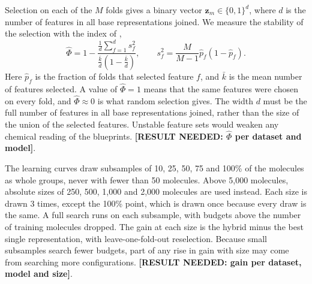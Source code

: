 Selection on each of the $M$ folds gives a binary vector $\mathbf{z}_m \in \{0,1\}^d$, where $d$ is the number of features in all base representations joined. We measure the stability of the selection with the index of \citet{Nogueira2018},
\[
\hat\Phi = 1 - \frac{\frac1d\sum_{f=1}^d s_f^2}{\frac{\bar k}{d}\left(1-\frac{\bar k}{d}\right)}, \qquad s_f^2 = \frac{M}{M-1}\hat p_f(1-\hat p_f).
\]
Here $\hat p_f$ is the fraction of folds that selected feature $f$, and $\bar k$ is the mean number of features selected. A value of $\hat\Phi=1$ means that the same features were chosen on every fold, and $\hat\Phi \approx 0$ is what random selection gives. The width $d$ must be the full number of features in all base representations joined, rather than the size of the union of the selected features. Unstable feature sets would weaken any chemical reading of the blueprints. \textbf{[RESULT NEEDED: $\hat\Phi$ per dataset and model]}.

The learning curves draw subsamples of 10, 25, 50, 75 and 100\% of the molecules as whole groups, never with fewer than 50 molecules. Above 5,000 molecules, absolute sizes of 250, 500, 1,000 and 2,000 molecules are used instead. Each size is drawn 3 times, except the 100\% point, which is drawn once because every draw is the same. A full search runs on each subsample, with budgets above the number of training molecules dropped. The gain at each size is the hybrid minus the best single representation, with leave-one-fold-out reselection. Because small subsamples search fewer budgets, part of any rise in gain with size may come from searching more configurations. \textbf{[RESULT NEEDED: gain per dataset, model and size]}.

